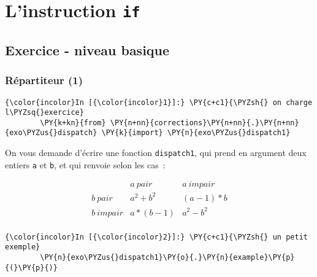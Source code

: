     
    
    
    

    

    \hypertarget{linstruction-if}{%
\section{\texorpdfstring{L'instruction
\texttt{if}}{L'instruction if}}\label{linstruction-if}}

    \hypertarget{exercice---niveau-basique}{%
\subsection{Exercice - niveau basique}\label{exercice---niveau-basique}}

    \hypertarget{ruxe9partiteur-1}{%
\subsubsection{Répartiteur (1)}\label{ruxe9partiteur-1}}

    \begin{Verbatim}[commandchars=\\\{\},frame=single,framerule=0.3mm,rulecolor=\color{cellframecolor}]
{\color{incolor}In [{\color{incolor}1}]:} \PY{c+c1}{\PYZsh{} on charge l\PYZsq{}exercice}
        \PY{k+kn}{from} \PY{n+nn}{corrections}\PY{n+nn}{.}\PY{n+nn}{exo\PYZus{}dispatch} \PY{k}{import} \PY{n}{exo\PYZus{}dispatch1}
\end{Verbatim}


    On vous demande d'écrire une fonction \texttt{dispatch1}, qui prend en
argument deux entiers \texttt{a} et \texttt{b}, et qui renvoie selon les
cas~:

\[
\begin{array}{c|c|c}
\ & a\  pair & a\ impair \\
\hline
b\ pair & a^2+b^2 & (a-1)*b\\
\hline
b\ impair & a*(b-1)& a^2-b^2\\
\end{array}
\]

    \begin{Verbatim}[commandchars=\\\{\},frame=single,framerule=0.3mm,rulecolor=\color{cellframecolor}]
{\color{incolor}In [{\color{incolor}2}]:} \PY{c+c1}{\PYZsh{} un petit exemple}
        \PY{n}{exo\PYZus{}dispatch1}\PY{o}{.}\PY{n}{example}\PY{p}{(}\PY{p}{)}
\end{Verbatim}


